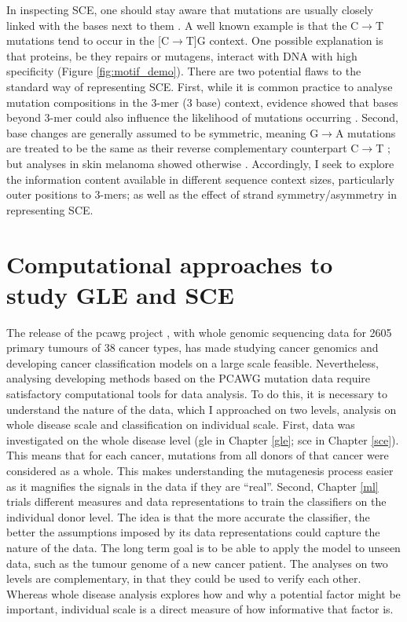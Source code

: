 In inspecting SCE, one should stay aware that mutations are usually closely linked with the \glspl{base} next to them \citep{Zhu2017}. A well known example is that the C$\rightarrow$T mutations tend to occur in the [C$\rightarrow$T]G context. One possible explanation is that proteins, be they repairs or mutagens, interact with DNA with high specificity (Figure \ref{fig:motif_demo}). There are two potential flaws to the standard way of representing SCE. First, while it is common practice to analyse mutation compositions in the 3-mer (3 base) context, evidence showed that bases beyond 3-mer could also influence the likelihood of mutations occurring \citep{Zhu2017,Zhu2020}. Second, base changes are generally assumed to be symmetric, meaning G$\rightarrow$A mutations are treated to be the same as their reverse complementary counterpart C$\rightarrow$T \citep{Alexandrov2013, Jiao2020}; but analyses in skin melanoma showed otherwise \citep{Zhu2017}. Accordingly, I seek to explore the information content available in different sequence context sizes, particularly outer positions to 3-mers; as well as the effect of strand symmetry/asymmetry in representing SCE.



\section{Computational approaches to study GLE and SCE}
\label{intro:ml}

The release of the \gls{pcawg} project \citep{Campbell2020}, with whole genomic sequencing data for 2605 primary tumours of 38 cancer types, has made studying cancer genomics and developing cancer classification models on a large scale feasible. Nevertheless, analysing developing methods based on the PCAWG mutation data require satisfactory computational tools for data analysis. To do this, it is necessary to understand the nature of the data, which I approached on two levels, analysis on whole disease scale and classification on individual scale. First, data was investigated on the whole disease level (\gls{gle} in Chapter \ref{gle}; \gls{sce} in Chapter \ref{sce}). This means that for each cancer, mutations from all donors of that cancer were considered as a whole. This makes understanding the mutagenesis process easier as it magnifies the signals in the data if they are ``real''. Second, Chapter \ref{ml} trials different measures and data representations to train the classifiers on the individual donor level. The idea is that the more accurate the classifier, the better the assumptions imposed by its data representations could capture the nature of the data. The long term goal is to be able to apply the model to unseen data, such as the tumour genome of a new cancer patient. The analyses on two levels are complementary, in that they could be used to verify each other. Whereas whole disease analysis explores how and why a potential factor might be important, individual scale is a direct measure of how informative that factor is.  

